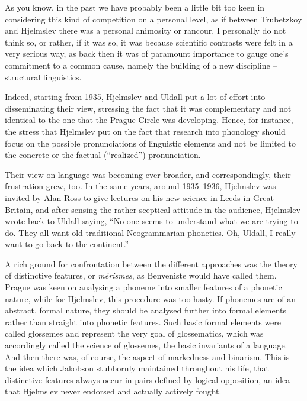 \documentclass[output=paper]{langscibook}
\begin{document}
As you know, in the past we have probably been a little bit too keen in considering this kind of competition on a personal level, as if between Trubetzkoy and Hjelmslev there was a personal animosity or rancour. I personally do not think so, or rather, if it was so, it was because scientific contrasts were felt in a very serious way, as back then it was of paramount importance to gauge one’s commitment to a common cause, namely the building of a new discipline -- structural linguistics. 

Indeed, starting from 1935, Hjelmslev and Uldall put a lot of effort into disseminating their view, stressing the fact that it was complementary and not identical to the one that the Prague Circle was developing. Hence, for instance, the stress that Hjelmslev put on the fact that research into phonology should focus on the possible pronunciations of linguistic elements and not be limited to the concrete or the factual (“realized”) pronunciation. 

Their view on language was becoming ever broader, and correspondingly, their frustration grew, too. In the same years, around 1935--1936, Hjelmslev was invited by Alan Ross to give lectures on his new science in Leeds in Great Britain, and after sensing the rather sceptical attitude in the audience, Hjelmslev wrote back to Uldall saying, “No one seems to understand what we are trying to do. They all want old traditional Neogrammarian phonetics. Oh, Uldall, I really want to go back to the continent.” 

A rich ground for confrontation between the different approaches was the theory of distinctive features, or \textit{mérismes}, as Benveniste would have called them. Prague was keen on analysing a phoneme into smaller features of a phonetic nature, while for Hjelmslev, this procedure was too hasty. If phonemes are of an abstract, formal nature, they should be analysed further into formal elements rather than straight into phonetic features. Such basic formal elements were called glossemes and represent the very goal of glossematics, which was accordingly called the science of glossemes, the basic invariants of a language. And then there was, of course, the aspect of markedness and binarism. This is the idea which Jakobson stubbornly maintained throughout his life, that distinctive features always occur in pairs defined by logical opposition, an idea that Hjelmslev never endorsed and actually actively fought. 
\end{document}
